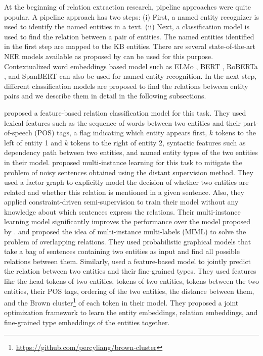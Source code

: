 At the beginning of relation extraction research, pipeline approaches were quite popular. A pipeline approach has two steps: (i) First, a named entity recognizer is used to identify the named entities in a text. (ii) Next, a classification model is used to find the relation between a pair of entities. The named entities identified in the first step are mapped to the KB entities. There are several state-of-the-art NER models available as proposed by  can be used for this purpose. Contextualized word embeddings based model such as ELMo , BERT , RoBERTa , and SpanBERT  can also be used for named entity recognition. In the next step, different classification models are proposed to find the relations between entity pairs and we describe them in detail in the following subsections.

 proposed a feature-based relation classification model for this task. They used lexical features such as the sequence of words between two entities and their part-of-speech (POS) tags, a flag indicating which entity appears first, $k$ tokens to the left of entity 1 and $k$ tokens to the right of entity 2, syntactic features such as dependency path between two entities, and named entity types of the two entities in their model.  proposed multi-instance learning for this task to mitigate the problem of noisy sentences obtained using the distant supervision method. They used a factor graph to explicitly model the decision of whether two entities are related and whether this relation is mentioned in a given sentence. Also, they applied constraint-driven semi-supervision to train their model without any knowledge about which sentences express the relations. Their multi-instance learning model significantly improves the performance over the model proposed by . 
 and  proposed the idea of multi-instance multi-labels (MIML) to solve the problem of overlapping relations. They used probabilistic graphical models that take a bag of sentences containing two entities as input and find all possible relations between them. Similarly,  used a feature-based model to jointly predict the relation between two entities and their fine-grained types. They used features like the head tokens of two entities, tokens of two entities, tokens between the two entities, their POS tags, ordering of the two entities, the distance between them, and the Brown cluster\footnote{\url{https://github.com/percyliang/brown-cluster}} of each token in their model. They proposed a joint optimization framework to learn the entity embeddings, relation embeddings, and fine-grained type embeddings of the entities together.

